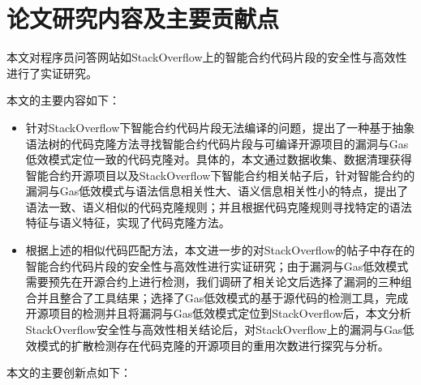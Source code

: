 \section{论文研究内容及主要贡献点}

本文对程序员问答网站如StackOverflow上的智能合约代码片段的安全性与高效性进行了实证研究。

本文的主要内容如下：

\begin{itemize}

\item 针对StackOverflow下智能合约代码片段无法编译的问题，提出了一种基于抽象语法树的代码克隆方法寻找智能合约代码片段与可编译开源项目的漏洞与Gas低效模式定位一致的代码克隆对。具体的，本文通过数据收集、数据清理获得智能合约开源项目以及StackOverflow下智能合约相关帖子后，针对智能合约的漏洞与Gas低效模式与语法信息相关性大、语义信息相关性小的特点，提出了语法一致、语义相似的代码克隆规则；并且根据代码克隆规则寻找特定的语法特征与语义特征，实现了代码克隆方法。


\item 根据上述的相似代码匹配方法，本文进一步的对StackOverflow的帖子中存在的智能合约代码片段的安全性与高效性进行实证研究；由于漏洞与Gas低效模式需要预先在开源合约上进行检测，我们调研了相关论文后选择了漏洞的三种组合并且整合了工具结果；选择了Gas低效模式的基于源代码的检测工具，完成开源项目的检测并且将漏洞与Gas低效模式定位到StackOverflow后，本文分析StackOverflow安全性与高效性相关结论后，对StackOverflow上的漏洞与Gas低效模式的扩散检测存在代码克隆的开源项目的重用次数进行探究与分析。

\end{itemize}

本文的主要创新点如下：

